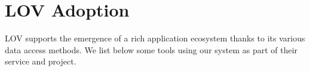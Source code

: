 \documentclass{iosart2c}
\begin{document}
\begin{description}
		
%							
%   
   
\end{description}


\section{LOV Adoption}
\label{sec:lovecosystem}
LOV supports the emergence of a rich application ecosystem thanks to its various data access methods. We list below some tools using our system as part of their service and project.
 
\end{document}
